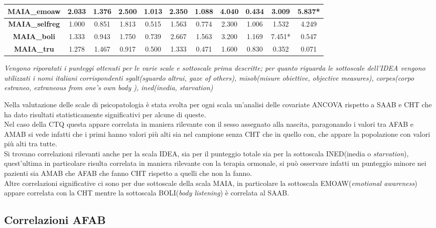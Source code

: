 \documentclass[12pt]{article}
\begin{document}
\begin{table}[H]
{{\begin{tabular}{|c|c|c|c|c|c|c|c|c||c|c|}
        \textbf{MAIA\_emoaw} & 2.033 &1.376& 2.500 &1.013& 2.350 &1.088& 4.040 &0.434& 3.009&5.837*\\\hline
        \textbf{MAIA\_selfreg} & 1.000 &0.851& 1.813 &0.515& 1.563 &0.774& 2.300 &1.006& 1.532&4.249\\\hline
        \textbf{MAIA\_boli} & 1.333 &0.943& 1.750 &0.739& 2.667 &1.563& 3.200 &1.169& 7.451*&0.547\\\hline
        \textbf{MAIA\_tru} & 1.278 &1.467& 0.917 &0.500& 1.333 &0.471& 1.600 &0.830& 0.352&0.071\\\hline
    \end{tabular}%
    }}
    \label{tab:my_label}
    \footnotesize \textit{Vengono riporatati i punteggi ottenuti per le varie scale e sottoscale prima descritte; per quanto riguarda le sottoscale dell'IDEA vengono utilizzati i nomi italiani corrispondenti sgalt(sguardo altrui, gaze of others), misob(misure obiettive, objective measures), corpes(corpo estraneo, extraneous from one's own body ), ined(inedia, starvation)}
\end{table}

Nella valutazione delle scale di psicopatologia è stata svolta per ogni scala un'analisi delle covariate ANCOVA rispetto a SAAB e CHT che ha dato risultati statisticamente significativi per alcune di queste.\\
Nel caso della CTQ questa appare correlata in maniera rilevante con il sesso assegnato alla nascita, paragonando i valori tra AFAB e AMAB si vede infatti che i primi hanno valori più alti sia nel campione senza CHT che in quello con, che appare la popolazione con valori più alti tra tutte.\\
Si trovano correlazioni rilevanti anche per la scala IDEA, sia per il punteggio totale sia per la sottoscala INED(inedia o \emph{starvation}), quest'ultima in particolare risulta correlata in maniera rilevante con la terapia ormonale, si può osservare infatti un punteggio minore nei pazienti sia AMAB che AFAB che fanno CHT rispetto a quelli che non la fanno.\\
Altre correlazioni significative ci sono per due sottoscale della scala MAIA, in particolare la sottoscala EMOAW(\emph{emotional awareness}) appare correlata con la CHT mentre la sottoscala BOLI(\emph{body listening}) è correlata al SAAB.
\subsection{Correlazioni AFAB}
\label{sec:orgff24876}
\end{document}
